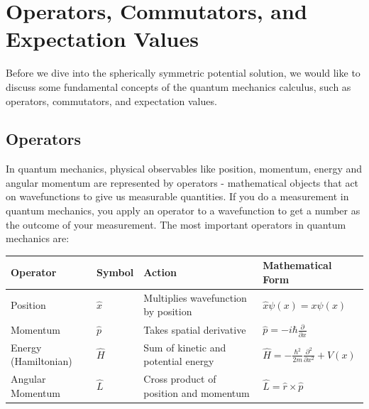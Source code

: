 \documentclass[
  a4paper,
]{book}
\begin{document}
\section{Operators, Commutators, and Expectation
Values}\label{operators-commutators-and-expectation-values}

Before we dive into the spherically symmetric potential solution, we
would like to discuss some fundamental concepts of the quantum mechanics
calculus, such as operators, commutators, and expectation values.

\subsection{Operators}\label{operators}

In quantum mechanics, physical observables like position, momentum,
energy and angular momentum are represented by operators - mathematical
objects that act on wavefunctions to give us measurable quantities. If
you do a measurement in quantum mechanics, you apply an operator to a
wavefunction to get a number as the outcome of your measurement. The
most important operators in quantum mechanics are:

\begin{longtable}[]{@{}
  >{\raggedright\arraybackslash}p{}
  >{\raggedright\arraybackslash}p{}
  >{\raggedright\arraybackslash}p{}
  >{\raggedright\arraybackslash}p{}@{}}
\toprule\noalign{}
\begin{minipage}[b]{\linewidth}\raggedright
Operator
\end{minipage} & \begin{minipage}[b]{\linewidth}\raggedright
Symbol
\end{minipage} & \begin{minipage}[b]{\linewidth}\raggedright
Action
\end{minipage} & \begin{minipage}[b]{\linewidth}\raggedright
Mathematical Form
\end{minipage} \\
\midrule\noalign{}
\endhead
\bottomrule\noalign{}
\endlastfoot
Position & \(\hat{x}\) & Multiplies wavefunction by position &
\(\hat{x}\psi(x) = x\psi(x)\) \\
Momentum & \(\hat{p}\) & Takes spatial derivative &
\(\hat{p} = -i\hbar\frac{\partial}{\partial x}\) \\
Energy (Hamiltonian) & \(\hat{H}\) & Sum of kinetic and potential energy
&
\(\hat{H} = -\frac{\hbar^2}{2m}\frac{\partial^2}{\partial x^2} + V(x)\) \\
Angular Momentum & \(\hat{L}\) & Cross product of position and momentum
& \(\hat{L} = \hat{r} \times \hat{p}\) \\
\end{longtable}
\end{document}
